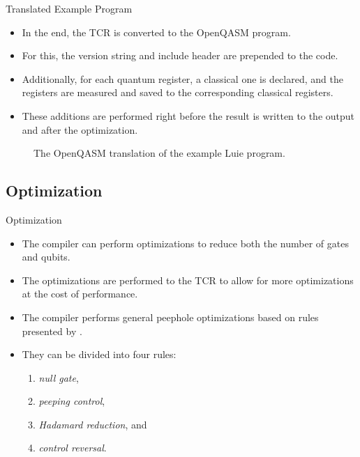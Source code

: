 \begin{frame}{Translated Example Program}    
    \begin{minipage}{.45\textwidth}
        \begin{itemize}
            \item In the end, the TCR is converted to the OpenQASM program.
            \item For this, the version string and include header are prepended to the code.
            \item Additionally, for each quantum register, a classical one is declared, and the registers are measured and saved to the corresponding classical registers. 
            \item These additions are performed right before the result is written to the output and after the optimization.
        \end{itemize}
    \end{minipage}
    \hfill
    \begin{minipage}{.50\textwidth}
        \centering
        \vfill
        \begin{figure}
            \centering
            
            \caption{The OpenQASM translation of the example Luie program.}
        \end{figure}
        \vfill
    \end{minipage}
\end{frame}

\subsection{Optimization}
\begin{frame}{Optimization}
    \begin{itemize}
        \item The compiler can perform optimizations to reduce both the number of gates and qubits.
        \item The optimizations are performed to the TCR to allow for more optimizations at the cost of performance.
        \item The compiler performs general peephole optimizations based on rules presented by \cite{GaCh11}.
        \item They can be divided into four rules:
        \begin{enumerate}
            \item \emph{null gate}, 
            \item \emph{peeping control}, 
            \item \emph{Hadamard reduction}, and
            \item \emph{control reversal}. 
        \end{enumerate}
    \end{itemize}
\end{frame}

